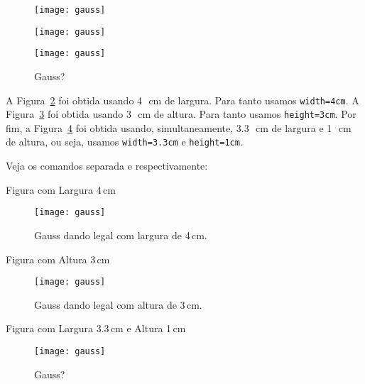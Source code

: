 \begin{figure}[!htbp]
\begin{minipage}[t]{0.3\linewidth} %
\texttt{[image: gauss]}
\caption{Gauss dando legal com largura de 4~cm.}
\label{fig:LeGauss1}
\end{minipage}
\hfill
\begin{minipage}[t]{0.3\linewidth}
\texttt{[image: gauss]}
\caption{Gauss dando legal com altura de 3~cm.}
\label{fig:LeGauss2}
\end{minipage}
\hfill
\begin{minipage}[t]{0.3\linewidth}
\texttt{[image: gauss]}
\caption{Gauss?}
\label{fig:LeGauss3}
\end{minipage}
\end{figure}

A Figura~\ref{fig:LeGauss1} foi obtida usando 4~\,cm de largura.
Para tanto usamos \Verb|width=4cm|.
A Figura~\ref{fig:LeGauss2} foi obtida usando 3~\,cm de altura.
Para tanto usamos \Verb|height=3cm|.
Por fim, a Figura~\ref{fig:LeGauss3} foi obtida usando, simultaneamente, 3.3~\,cm 
de largura e 1~\,cm de altura, ou seja, usamos \Verb|width=3.3cm| e \Verb|height=1cm|.

Veja os comandos separada e respectivamente:

\begin{codigo}{Figura com Largura 4\,cm}{\lapis}
\begin{figure}[!htbp]%
\texttt{[image: gauss]}%
\caption{Gauss dando legal com largura de 4\,cm.}%
\label{fig:LeGauss1}%
\end{figure}
\end{codigo}

\begin{codigo}{Figura com Altura 3\,cm}{\lapis}
\begin{figure}[!htbp]
  \texttt{[image: gauss]}
  \caption{Gauss dando legal com altura de 3\,cm.}
  \label{fig:LeGauss2}
\end{figure}
\end{codigo}

\begin{codigo}{Figura com Largura 3.3\,cm e Altura 1\,cm}{\lapis}
\begin{figure}[!htbp]
  \texttt{[image: gauss]}
  \caption{Gauss?}
  \label{fig:LeGauss3}
\end{figure}
\end{codigo}

